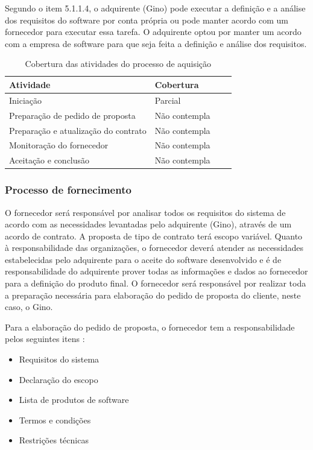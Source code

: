 Segundo o item 5.1.1.4, o adquirente (Gino) pode executar a definição e a análise dos requisitos do software por conta própria ou pode manter acordo com um fornecedor para executar essa tarefa. O adquirente optou por manter um acordo com a empresa de software para que seja feita a definição e análise dos requisitos. 

\begin{table}[htb]
      \begin{center}
        \begin{tabular}{| l | l | l | l |}
        \hline
        \textbf{Atividade} & \textbf{Cobertura} \\ \hline
        Iniciação & Parcial \\ \hline
        Preparação de pedido de proposta & Não contempla \\ \hline
        Preparação e atualização do contrato & Não contempla \\ \hline
        Monitoração do fornecedor & Não contempla \\ \hline
        Aceitação e conclusão & Não contempla \\ \hline
        \end{tabular}
      \end{center}
    \caption{Cobertura das atividades do processo de aquisição}
    \end{table}



\subsubsection{\large{Processo de fornecimento}}
\label{sec:fornecimento}

O fornecedor será responsável por analisar todos os requisitos do sistema de acordo com as necessidades levantadas pelo adquirente (Gino), através de um acordo de contrato. A proposta de tipo de contrato terá escopo variável. Quanto à responsabilidade das organizações, o fornecedor deverá atender as necessidades estabelecidas pelo adquirente para o aceite do software desenvolvido e é de responsabilidade do adquirente prover todas as informações e dados ao fornecedor para a definição do produto final.
O fornecedor será responsável por realizar toda a preparação necessária para elaboração do pedido de proposta do cliente, neste caso, o Gino.

Para a elaboração do pedido de proposta, o fornecedor tem a responsabilidade pelos seguintes itens \cite{iso12207:95}:
\begin{itemize}
  \item Requisitos do sistema
  \item Declaração do escopo
  \item Lista de produtos de software
  \item Termos e condições
  \item Restrições técnicas
\end{itemize}

